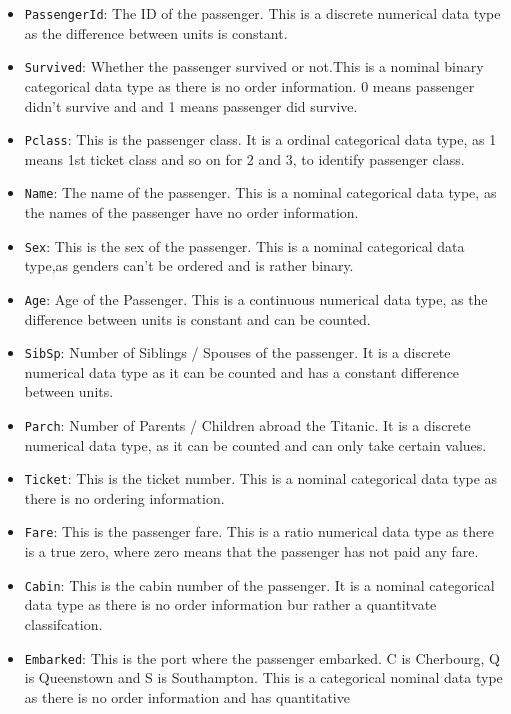 \documentclass[a4paper, twocolumn]{article}
\begin{document}
\begin{itemize}
    \item \texttt{PassengerId}: The ID of the passenger. This is a discrete numerical data type as the difference
     between units is constant.
    \item \texttt{Survived}: Whether the passenger survived or not.This is a nominal binary categorical data type 
    as there is no order information. 0 means passenger didn't survive and and 1 means passenger did survive.
    \item \texttt{Pclass}: This is the passenger class. It is a ordinal categorical data type, as 1 means 1st ticket 
    class and so on for 2 and 3, to identify passenger class.
    \item \texttt{Name}: The name of the passenger. This is a  nominal categorical data type, as the names of the 
    passenger have no order information.
    \item \texttt{Sex}: This is the sex of the passenger. This is a nominal categorical data type,as genders can't be 
    ordered and is rather binary.
    \item \texttt{Age}: Age of the Passenger. This is a continuous numerical data type, as the difference between 
    units is constant and can be counted.
    \item \texttt{SibSp}: Number of Siblings / Spouses of the passenger. It is a discrete numerical data type as it 
    can be counted and has a constant difference between units.
    \item \texttt{Parch}: Number of Parents / Children abroad the Titanic. It is a discrete numerical data type, as 
    it can be counted and can only take certain values.
    \item \texttt{Ticket}: This is the ticket number. This is a  nominal categorical data type as there is no ordering 
    information.
    \item \texttt{Fare}: This is the passenger fare. This is a ratio numerical data type as there is a true zero, 
    where zero means that the passenger has not paid any fare.
    \item \texttt{Cabin}: This is the cabin number of the passenger. It is a nominal categorical data type as there 
    is no order information bur rather a quantitvate classifcation.
    \item \texttt{Embarked}: This is the port where the passenger embarked. C is Cherbourg, Q is Queenstown and S 
    is Southampton. This is a categorical nominal data type as there is no order information and has quantitative 

\end{itemize}
\end{document}
